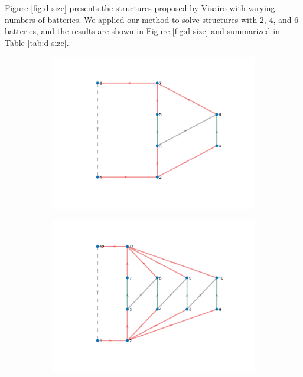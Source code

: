 \documentclass{article}
\begin{document}
Figure \ref{fig:d-size} presents the structures proposed by Visairo \cite{visairoReconfigurableBatteryPack2008} with varying numbers of batteries. 
We applied our method to solve structures with 2, 4, and 6 batteries, and the results are shown in Figure \ref{fig:d-size} and summarized in Table \ref{tab:d-size}.

\begin{figure}[htbp]
  \centering
  \begin{subfigure}[b]{0.3\textwidth}
    \includegraphics[width=\textwidth]{../attachments/f-dege-mac-2.png}
    \caption{}
    \label{fig:d-size-2}
  \end{subfigure}
  \hspace{0.05\textwidth}
  \begin{subfigure}[b]{0.3\textwidth}
    \includegraphics[width=\textwidth]{../attachments/f-dege-mac-4.png}

\end{subfigure}
\end{figure}
\end{document}
